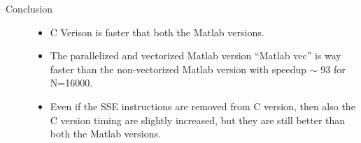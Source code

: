 \documentclass[10pt,twoside]{article}
\begin{document}
 \begin{description}
    \item[Conclusion] \hfill 
      \begin{itemize}
        \item C Verison is faster that both the Matlab versions.  
        \item The parallelized and vectorized Matlab version ``Matlab vec'' is way faster than the non-vectorized Matlab version with speedup $\sim$ 93 for N=16000.
        \item Even if the SSE instructions are removed from C version, then also the C version timing are slightly increased, but they are still better than both the Matlab versions.  
      \end{itemize}
  \end{description}
\end{document}
